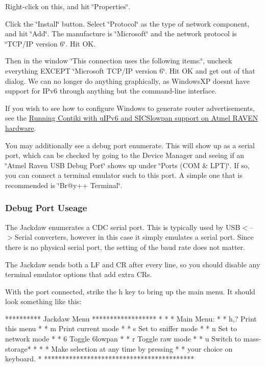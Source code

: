 Right-\/click on this, and hit \char`\"{}\+Properties\char`\"{}.

Click the \char`\"{}\+Install\char`\"{} button. Select \char`\"{}\+Protocol\char`\"{} as the type of network component, and hit \char`\"{}\+Add\char`\"{}. The manufacture is \char`\"{}\+Microsoft\char`\"{} and the network protocol is \char`\"{}\+T\+C\+P/\+I\+P version 6\char`\"{}. Hit OK.

Then in the window \char`\"{}\+This connection uses the following items\+:\char`\"{}, uncheck everything E\+X\+C\+E\+PT \char`\"{}\+Microsoft T\+C\+P/\+I\+P version 6\char`\"{}. Hit OK and get out of that dialog. We can no longer do anything graphically, as Windows\+XP doesn\textquotesingle{}t have support for I\+Pv6 through anything but the command-\/line interface.

If you wish to see how to configure Windows to generate router advertisements, see the \hyperlink{a00072}{Running Contiki with u\+I\+Pv6 and S\+I\+C\+Slowpan support on Atmel R\+A\+V\+EN hardware}.

You may additionally see a debug port enumerate. This will show up as a serial port, which can be checked by going to the Device Manager and seeing if an \char`\"{}\+Atmel Raven U\+S\+B Debug Port\char`\"{} shows up under \char`\"{}\+Ports (\+C\+O\+M \& L\+P\+T)\char`\"{}. If so, you can connect a terminal emulator such to this port. A simple one that is recommended is \char`\"{}\+Br@y++ Terminal\char`\"{}.\hypertarget{a00067_DebugPort}{}\subsubsection{Debug Port Useage}\label{a00067_DebugPort}
The Jackdaw enumerates a C\+DC serial port. This is typically used by U\+SB$<$--$>$Serial converters, however in this case it simply emulates a serial port. Since there is no physical serial port, the setting of the baud rate does not matter.

The Jackdaw sends both a LF and CR after every line, so you should disable any terminal emulator options that add extra CR\textquotesingle{}s.

With the port connected, strike the \textquotesingle{}h\textquotesingle{} key to bring up the main menu. It should look something like this\+:

\begin{DoxyVerb}********** Jackdaw Menu ******************
*                                        *
* Main Menu:                             *
*  h,?             Print this menu       *
*  m               Print current mode    *
*  s               Set to sniffer mode   *
*  n               Set to network mode   *
*  6               Toggle 6lowpan        *
*  r               Toggle raw mode       *
*  u               Switch to mass-storage*
*                                        *
* Make selection at any time by pressing *
* your choice on keyboard.               *
******************************************
\end{DoxyVerb}



